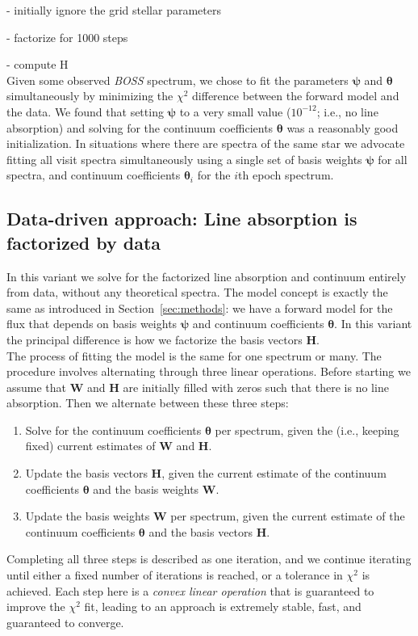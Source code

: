 \documentclass[modern]{aastex631}
\newcommand{\vectheta}{\boldsymbol{\theta}}
\newcommand{\vecpsi}{\boldsymbol{\psi}}
\newcommand{\vecW}{\mathbf{W}}
\newcommand{\vecH}{\mathbf{H}}
\begin{document}
- initially ignore the grid stellar parameters 

- factorize for 1000 steps

- compute H\\

Given some observed \emph{BOSS} spectrum, we chose to fit the parameters $\vecpsi$ and $\vectheta$ simultaneously by minimizing the $\chi^2$ difference between the forward model and the data. We found that setting $\vecpsi$ to a very small value ($10^{-12}$; i.e., no line absorption) and solving for the continuum coefficients $\vectheta$ was a reasonably good initialization. In situations where there are spectra of the same star we advocate fitting all visit spectra simultaneously using a single set of basis weights $\vecpsi$ for all spectra, and continuum coefficients $\vectheta_i$ for the $i$th epoch spectrum. 


\subsection{Data-driven approach: Line absorption is factorized by data}
\label{sec:data-method}

In this variant we solve for the factorized line absorption and continuum entirely from data, without any theoretical spectra. The model concept is exactly the same as introduced in Section~\ref{sec:methods}: we have a forward model for the flux that depends on basis weights $\vecpsi$ and continuum coefficients $\vectheta$. In this variant the principal difference is how we factorize the basis vectors $\vecH$.\\

The process of fitting the model is the same for one spectrum or many. The procedure involves alternating through three linear operations. Before starting we assume that $\vecW$ and $\vecH$ are initially filled with zeros such that there is no line absorption. Then we alternate between these three steps:
\begin{enumerate}
    \item Solve for the continuum coefficients $\vectheta$ per spectrum, given the (i.e., keeping fixed) current estimates of $\vecW$ and $\vecH$.
    \item Update the basis vectors $\vecH$, given the current estimate of the continuum coefficients $\vectheta$ and the basis weights $\vecW$.
    \item Update the basis weights $\vecW$ per spectrum, given the current estimate of the continuum coefficients $\vectheta$ and the basis vectors $\vecH$.
\end{enumerate}
Completing all three steps is described as one iteration, and we continue iterating until either a fixed number of iterations is reached, or a tolerance in $\chi^2$ is achieved. Each step here is a \emph{convex linear operation} that is guaranteed to improve the $\chi^2$ fit, leading to an approach is extremely stable, fast, and guaranteed to converge.\\
\end{document}
